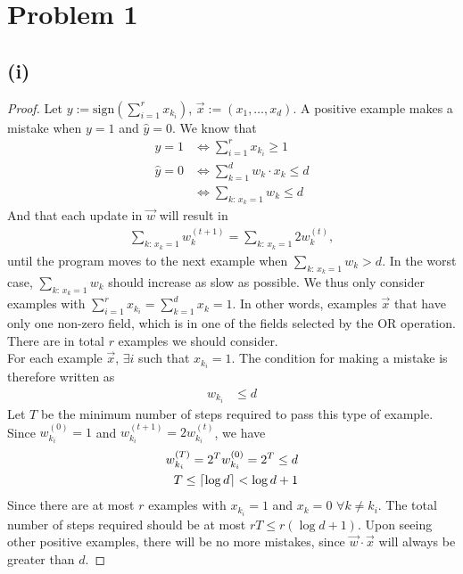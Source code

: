 \documentclass[twoside,11pt]{homework}
\date{02/28/2020}
\DeclarePairedDelimiter{\ceil}{\lceil}{\rceil}
\begin{document}
\maketitle

\section*{Problem 1}
\subsection*{(i)}
	\begin{proof}
		Let $y := \text{sign} \left(\sum_{i=1}^{r}x_{k_i}\right)$, $\vec{x} := (x_1,\dots,x_d)$.
		A positive example makes a mistake when $y=1$ and $\hat{y}=0$. We know that
		\begin{align*}
			y=1 &\Longleftrightarrow \sum_{i=1}^{r}x_{k_i} \geq 1 \\
			\hat{y}=0 &\Longleftrightarrow \sum_{k=1}^{d} w_k \cdot x_{k} \leq d \\
			&\Longleftrightarrow \sum_{k: \,x_k=1} w_k  \leq d
		\end{align*}
		And that each update in $\vec{w}$ will result in
		\begin{align*}
			\sum_{k: \,x_k=1} w_k^{(t+1)}  = \sum_{k: \,x_k=1} 2w_k^{(t)},
		\end{align*}
		until the program moves to the next example when $\sum_{k: \,x_k=1} w_k  > d$.
		In the worst case, $\sum_{k: \,x_k=1} w_k$ should increase as slow as possible.
		We thus only consider examples with $\sum_{i=1}^{r}x_{k_i}=\sum_{k=1}^{d} x_{k}=1$.
		In other words, examples $\vec{x}$ that have only one non-zero field,
		which is in one of the fields selected by the OR operation.
		There are in total $r$ examples we should consider.\\
		For each example $\vec{x}$, $\exists i $ such that $x_{k_i} = 1$.
		The condition for making a mistake is therefore written as
		\begin{align*}
			w_{k_i}  &\leq d
		\end{align*}
		Let $T$ be the minimum number of steps required to pass this type of example.
		Since $w_{k_i} ^{(0)} = 1$ and $w_{k_i} ^{(t+1)} = 2w_{k_i} ^{(t)} $, we have
		\begin{align*}
			w_{k_i}^{(T)} =  2^T w_{k_i}^{(0)} =  2^T \leq d \\
			T\leq \ceil{\log{d}} < \log{d}+1
		\end{align*}
		Since there are at most $r$ examples with $x_{k_i} = 1$ and $x_k = 0$ $\forall k \neq k_i$.
		The total number of steps required should be at most $rT \leq r(\log{d} + 1)$.
		Upon seeing other positive examples, there will be no more mistakes, since $\vec{w}\cdot\vec{x}$ will always be greater than $d$.
	\end{proof}
\end{document}
